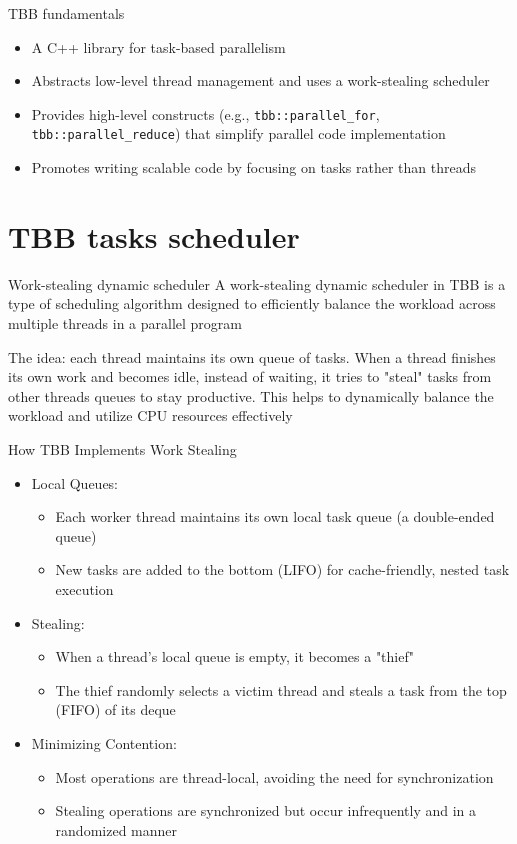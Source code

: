\documentclass{beamer}
\begin{document}
\begin{frame}{TBB fundamentals}
  \begin{itemize}
    \item A C++ library for task-based parallelism
    \item Abstracts low-level thread management and uses a work-stealing scheduler
    \item Provides high-level constructs (e.g., \texttt{tbb::parallel\_for}, \texttt{tbb::parallel\_reduce}) that simplify parallel code implementation
    \item Promotes writing scalable code by focusing on tasks rather than threads
  \end{itemize}
\end{frame}

\section{TBB tasks scheduler}

\begin{frame}{Work-stealing dynamic scheduler}
  A work-stealing dynamic scheduler in TBB is a type of scheduling algorithm designed to efficiently balance the workload across multiple threads in a parallel program

  The idea: each thread maintains its own queue of tasks. When a thread finishes its own work and becomes idle, instead of waiting, it tries to "steal" tasks from other threads queues to stay productive. This helps to dynamically balance the workload and utilize CPU resources effectively
\end{frame}

\begin{frame}{How TBB Implements Work Stealing}
  \begin{itemize}
    \item Local Queues:
      \begin{itemize}
        \item Each worker thread maintains its own local task queue (a double-ended queue)
        \item New tasks are added to the bottom (LIFO) for cache-friendly, nested task execution
      \end{itemize}
    \item Stealing:
      \begin{itemize}
        \item When a thread's local queue is empty, it becomes a "thief"
        \item The thief randomly selects a victim thread and steals a task from the top (FIFO) of its deque
      \end{itemize}
    \item Minimizing Contention:
      \begin{itemize}
        \item Most operations are thread-local, avoiding the need for synchronization
        \item Stealing operations are synchronized but occur infrequently and in a randomized manner
      \end{itemize}
  \end{itemize}
\end{frame}
\end{document}
